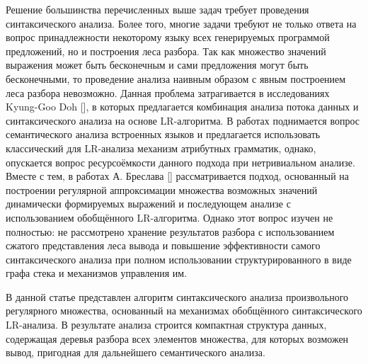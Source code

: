 Решение большинства перечисленных выше задач требует проведения синтаксического анализа. Более того, многие задачи требуют не только ответа на вопрос принадлежности некоторому языку всех генерируемых 
программой предложений, но и построения леса разбора. Так как множество значений выражения может быть бесконечным и сами предложения могут быть бесконечными, то проведение анализа наивным образом с явным 
построением леса разбора невозможно. Данная проблема затрагивается в исследованиях Kyung-Goo Doh [], в которых предлагается комбинация анализа потока данных и синтаксического анализа на основе LR-алгоритма. 
В работах поднимается вопрос семантического анализа встроенных языков и предлагается использовать классический для LR-анализа механизм атрибутных грамматик, однако, опускается вопрос ресурсоёмкости данного 
подхода при нетривиальном анализе. Вместе с тем, в работах А. Бреслава [] рассматривается подход, основанный на построении регулярной аппроксимации множества возможных значений динамически формируемых 
выражений и последующем анализе с использованием обобщённого LR-алгоритма. Однако этот вопрос изучен не полностью: не рассмотрено хранение результатов разбора с использованием сжатого представления леса 
вывода и повышение эффективности самого синтаксического анализа при полном использовании структурированного в виде графа стека и механизмов управления им.

В данной статье представлен алгоритм синтаксического анализа произвольного регулярного множества, основанный на механизмах обобщённого синтаксического LR-анализа. В результате анализа строится компактная 
структура данных, содержащая деревья разбора всех элементов множества, для которых возможен вывод, пригодная для дальнейшего семантического анализа.

